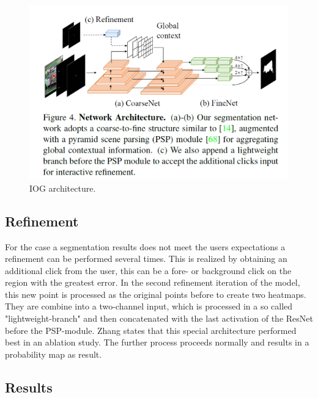 \begin{figure}
	\includegraphics[width=\linewidth]{figures/chap31_arch.png}
	\caption{IOG architecture.}
	\label{fig:ch3:sec1:arch}
\end{figure}

\subsection{Refinement}\label{ord:ch3:sec1:subsec3}
For the case a segmentation results does not meet the users expectations a refinement can be performed several times. 
This is realized by obtaining an additional click from the user, this can be a fore- or background click on the region with the greatest error. 
In the second refinement iteration of the model, this new point is processed as the original points before to create two heatmaps. 
They are combine into a two-channel input, which is processed in a so called "lightweight-branch" and then concatenated with the last activation of the ResNet before the PSP-module. 
Zhang states that this special architecture performed best in an ablation study.
The further process proceeds normally and results in a probability map as result. 

\subsection{Results}\label{ord:ch3:sec1:subsec4}

